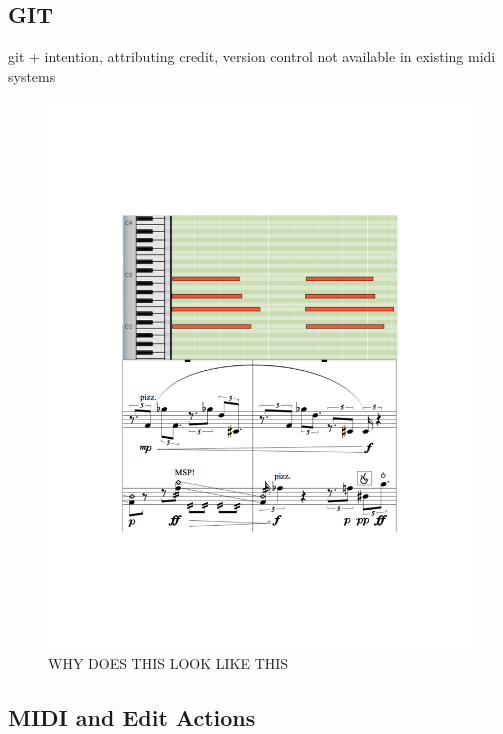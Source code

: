 \documentclass[final,authoryear,5p,times,twocolumn]{elsarticle}
\begin{document}
\subsection{GIT}

git + intention, attributing credit, version control not available in existing midi systems



\begin{figure}
\vspace*{-3cm}
	\includegraphics[scale=0.4]{midi.pdf}
	\caption{WHY DOES THIS LOOK LIKE THIS}
	\label{fig:midi}
\end{figure}

\subsection{MIDI and Edit Actions}

\end{document}
